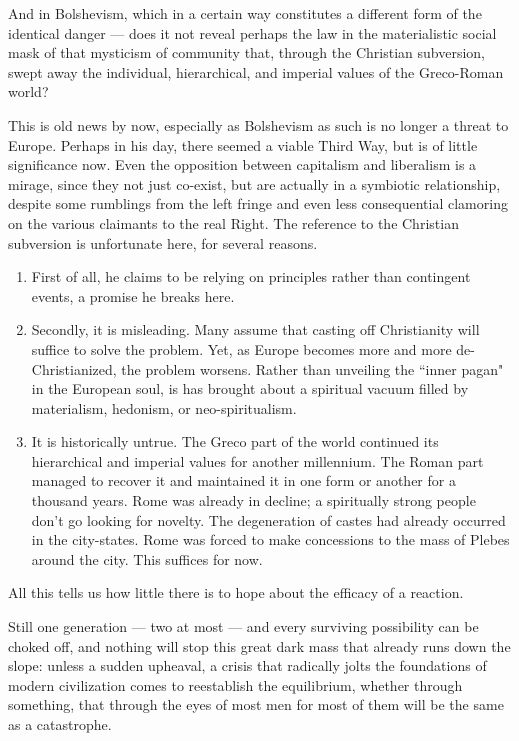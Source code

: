And in Bolshevism, which in a certain way constitutes a different form of the identical danger — does it not reveal perhaps the law in the materialistic social mask of that mysticism of community that, through the Christian subversion, swept away the individual, hierarchical, and imperial values of the Greco-Roman world? 

\begin{quotex}
This is old news by now, especially as Bolshevism as such is no longer a threat to Europe. Perhaps in his day, there seemed a viable Third Way, but is of little significance now. Even the opposition between capitalism and liberalism is a mirage, since they not just co-exist, but are actually in a symbiotic relationship, despite some rumblings from the left fringe and even less consequential clamoring on the various claimants to the real Right. The reference to the Christian subversion is unfortunate here, for several reasons.

\begin{enumerate}
\item First of all, he claims to be relying on principles rather than contingent events, a promise he breaks here. 
\item Secondly, it is misleading. Many assume that casting off Christianity will suffice to solve the problem. Yet, as Europe becomes more and more de-Christianized, the problem worsens. Rather than unveiling the ``inner pagan" in the European soul, is has brought about a spiritual vacuum filled by materialism, hedonism, or neo-spiritualism. 
\item It is historically untrue. The Greco part of the world continued its hierarchical and imperial values for another millennium. The Roman part managed to recover it and maintained it in one form or another for a thousand years. Rome was already in decline; a spiritually strong people don't go looking for novelty. The degeneration of castes had already occurred in the city-states. Rome was forced to make concessions to the mass of Plebes around the city. This suffices for now. 
\end{enumerate}
\end{quotex}
All this tells us how little there is to hope about the efficacy of a reaction. 

Still one generation — two at most — and every surviving possibility can be choked off, and nothing will stop this great dark mass that already runs down the slope: unless a sudden upheaval, a crisis that radically jolts the foundations of modern civilization comes to reestablish the equilibrium, whether through something, that through the eyes of most men for most of them will be the same as a catastrophe. 


